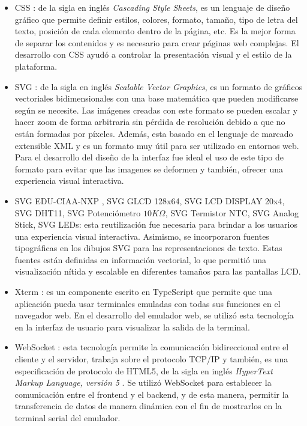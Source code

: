 \begin{itemize}
	\item CSS \citep{CSS}: de la sigla en inglés \textit{Cascading Style Sheets},
	es un lenguaje de diseño gráfico que permite definir estilos, colores, formato, tamaño, tipo de letra del texto, posición de cada elemento dentro de la página, etc. Es la mejor forma de separar los contenidos y es necesario para crear páginas web complejas. El desarrollo con CSS ayudó a controlar la presentación visual y el estilo de la plataforma.

    \item SVG \citep{SVG}: de la sigla en inglés \textit{Scalable Vector Graphics}, es un formato de gráficos vectoriales bidimensionales con una base matemática que pueden modificarse según se necesite. Las imágenes creadas con este formato se pueden escalar y hacer zoom de forma arbitraria sin pérdida de resolución debido a que no están formadas por píxeles. Además, esta basado en el lenguaje de marcado extensible XML \citep{XML} y es un formato muy útil para ser utilizado en entornos web. 
Para el desarrollo del diseño de la interfaz fue ideal el uso de este tipo de formato para evitar que las imagenes se deformen y también, ofrecer una experiencia visual interactiva.

    \item SVG EDU-CIAA-NXP \citep{SVGFirmwareV3}, SVG GLCD 128x64, SVG LCD DISPLAY 20x4, SVG DHT11, SVG Potenciómetro \(10K\Omega\), SVG Termistor NTC, SVG Analog Stick, SVG LEDs: esta reutilización fue necesaria para brindar a los usuarios una experiencia visual interactiva. Asimismo, se incorporaron fuentes tipográficas en los dibujos SVG para las representaciones de texto. Estas fuentes  están definidas en información vectorial,  lo que permitió una visualización nítida y escalable en diferentes tamaños para las pantallas LCD.

    \item Xterm \citep{Xterm}: es un componente escrito en TypeScript \citep{TypeScript} que permite que una aplicación pueda usar terminales emuladas con todas sus funciones en el navegador web. 
En el desarrollo del emulador web, se utilizó esta tecnología en la interfaz de usuario para visualizar la salida de la terminal.

    \item WebSocket \citep{WebSocket}: esta tecnología permite la comunicación bidireccional entre el cliente y el servidor, trabaja sobre el protocolo TCP/IP y también, es una especificación de protocolo de HTML5, de la sigla en inglés \textit{HyperText Markup Language, versión 5} \citep{HTML5}. 
Se utilizó WebSocket para establecer la comunicación entre el frontend y el backend, y de esta manera, permitir la transferencia de datos de manera dinámica con el fin de mostrarlos en la terminal serial del emulador. 
       

\end{itemize}
